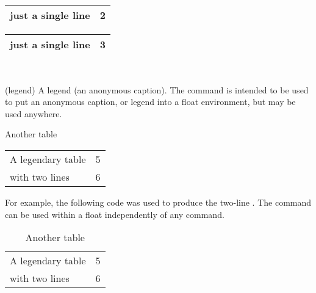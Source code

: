    \begin{shadetable}
   \begin{tabular}{lc} \toprule
    just a single line & 2 \\ \bottomrule
   \end{tabular}
   \end{shadetable}

   \begin{shadetable}
   \begin{tabular}{lc} \toprule
    just a single line & 3 \\ \bottomrule
   \end{tabular}
   \end{shadetable}



\begin{syntax}
\cmd{\legend} \\
\end{syntax}
\glossary(legend)%
  {}%
  {A legend (an anonymous caption).}
  The \cmd{\legend} command is intended to be used to put an 
anonymous caption, or legend into a float 
environment, but may be used anywhere.

   \begin{shadetable}
   \caption{Another table} \label{tab:legend}
   \begin{tabular}{lc} \toprule
    A legendary table & 5 \\
    with two lines    & 6 \\ \bottomrule
   \end{tabular}
   \end{shadetable}

    For example, the following code was used to produce the two-line
. The \cmd{\legend} command can be used within a 
float
independently of any \cmd{\caption} command.
\begin{lcode}
\begin{table}
  \centering
  \caption{Another table} \label{tab:legend}
  \begin{tabular}{lc} \toprule
  A legendary table & 5 \\
  with two lines    & 6 \\ \bottomrule
  \end{tabular}
\end{table}
\end{lcode}

